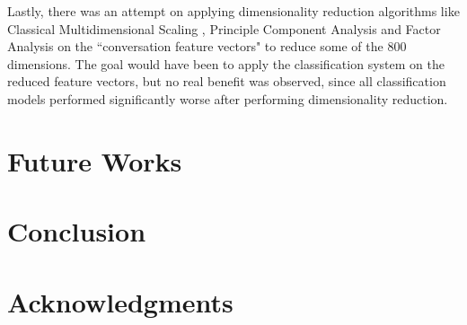 \documentclass[11pt]{article}
\begin{document}
Lastly, there was an attempt on applying dimensionality reduction algorithms like Classical Multidimensional Scaling \cite{borg2005modern}, Principle Component Analysis and Factor Analysis \cite{jolliffe1986principal} on the ``conversation feature vectors" to reduce some of the 800 dimensions. The goal would have been to apply the classification system on the reduced feature vectors, but no real benefit was observed, since all classification models performed significantly worse after performing dimensionality reduction.  


\section{Future Works}

\section{Conclusion}

\section*{Acknowledgments}


\end{document}
